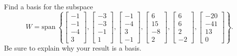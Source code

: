 \documentclass{article}
\begin{document}
\begin{exerciseStatement}
    Find a basis for the subspace
\[W=\mathrm{span}\ \left\{\left[\begin{array}{r}
-1 \\
-1 \\
-4 \\
3
\end{array}\right] , \left[\begin{array}{r}
-3 \\
-3 \\
-1 \\
1
\end{array}\right] , \left[\begin{array}{r}
-1 \\
-4 \\
3 \\
-1
\end{array}\right] , \left[\begin{array}{r}
6 \\
15 \\
-8 \\
2
\end{array}\right] , \left[\begin{array}{r}
6 \\
6 \\
2 \\
-2
\end{array}\right] , \left[\begin{array}{r}
-20 \\
-41 \\
13 \\
0
\end{array}\right]\right\}.\]
 Be sure to explain why your result is a basis.


  
\end{exerciseStatement}
\end{document}
